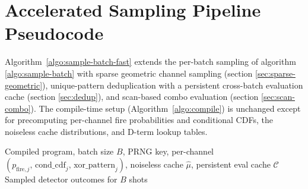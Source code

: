 \documentclass[a4paper,onecolumn,11pt,accepted=2026-06-10]{quantumarticle}
\begin{document}
\clearpage
\section{Accelerated Sampling Pipeline Pseudocode}
\label{appendix:pseudocode_fast}
Algorithm~\ref{algo:sample-batch-fast} extends the per-batch sampling of algorithm \ref{algo:sample-batch} with sparse geometric channel sampling (section \ref{sec:sparse-geometric}), unique-pattern deduplication with a persistent cross-batch evaluation cache (section \ref{sec:dedup}), and scan-based combo evaluation (section \ref{sec:scan-combo}). The compile-time setup (Algorithm~\ref{algo:compile}) is unchanged except for precomputing per-channel fire probabilities and conditional CDFs, the noiseless cache distributions, and D-term lookup tables.

\begin{algorithm}[H]
\tiny
\caption{Accelerated per-batch sampling with sparse geometric channel sampling, cross-batch deduplication, and scan-based evaluation.}
\label{algo:sample-batch-fast}
\begin{algorithmic}[1]
\Input Compiled program, batch size $B$, PRNG key, per-channel
    $(p_{\mathrm{fire},j},\, \mathrm{cond\_cdf}_j,\, \mathrm{xor\_pattern}_j)$,
    noiseless cache $\hat{\mu}$, persistent eval cache $\mathcal{C}$
\Output Sampled detector outcomes for $B$ shots


\end{algorithmic}
\end{algorithm}
\end{document}
